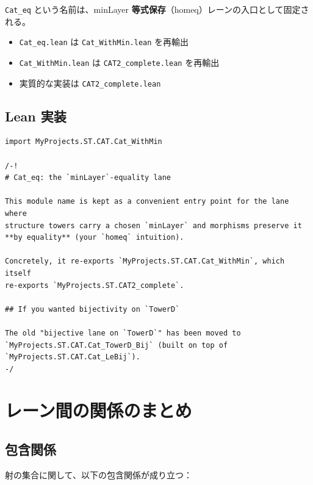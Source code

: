 \documentclass{ltjsarticle}
\theoremstyle{definition}
\begin{document}
\texttt{Cat\_eq} という名前は、minLayer \textbf{等式保存}（homeq）レーンの入口として固定される。

\begin{itemize}
  \item \texttt{Cat\_eq.lean} は \texttt{Cat\_WithMin.lean} を再輸出
  \item \texttt{Cat\_WithMin.lean} は \texttt{CAT2\_complete.lean} を再輸出
  \item 実質的な実装は \texttt{CAT2\_complete.lean}
\end{itemize}

\subsection{Lean 実装}

\begin{lstlisting}[caption=Cat\_eq.lean の内容]
import MyProjects.ST.CAT.Cat_WithMin

/-!
# Cat_eq: the `minLayer`-equality lane

This module name is kept as a convenient entry point for the lane where 
structure towers carry a chosen `minLayer` and morphisms preserve it 
**by equality** (your `homeq` intuition).

Concretely, it re-exports `MyProjects.ST.CAT.Cat_WithMin`, which itself 
re-exports `MyProjects.ST.CAT2_complete`.

## If you wanted bijectivity on `TowerD`

The old "bijective lane on `TowerD`" has been moved to 
`MyProjects.ST.CAT.Cat_TowerD_Bij` (built on top of 
`MyProjects.ST.CAT.Cat_LeBij`).
-/
\end{lstlisting}

\section{レーン間の関係のまとめ}

\subsection{包含関係}

射の集合に関して、以下の包含関係が成り立つ：
\end{document}
